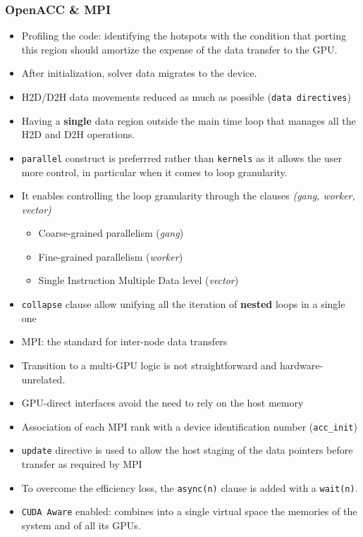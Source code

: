 \documentclass[10pt,a4paper]{article}
\newcommand{\code}[1]{\colorbox{light-gray}{\texttt{#1}}}
\begin{document}
\subsubsection{OpenACC \& MPI}
\begin{itemize}
\item Profiling the code: identifying the hotspots with the condition that porting this region should amortize the expense of the data transfer to the GPU.
\item After initialization, solver data migrates to the device.
\item H2D/D2H data movements reduced as much as possible (\code{data directives})
\item Having a \textbf{single} data region outside the main time loop that manages all the H2D and D2H operations.
\item \code{parallel} construct is preferrred rather than \code{kernels} as it allows the user more control, in particular when it comes to loop granularity.
\item It enables controlling the loop granularity through the clauses \textit{(gang, worker, vector)}
\begin{itemize}
\item Coarse-grained parallelism (\textit{gang})
\item Fine-grained parallelism (\textit{worker})
\item Single Instruction Multiple Data level (\textit{vector})
\end{itemize}
\item \code{collapse} clause allow unifying all the iteration of \textbf{nested }loops in a single one
\end{itemize}
\vspace{0.2cm}
\begin{itemize}
\item MPI: the standard for inter-node data transfers
\item Transition to a multi-GPU logic is not straightforward and hardware-unrelated.
\item GPU-direct interfaces avoid the need to rely on the host memory
\item Association of each MPI rank with a device identification number (\code{acc_init})
\item \code{update} directive is used to allow the host staging of the data pointers before transfer as required by MPI
\item To overcome the efficiency loss, the \code{async(n)} clause is added with a \code{wait(n)}.
\item \code{CUDA Aware} enabled: combines into a single virtual space the memories of the system and of all its GPUs.
\end{itemize}
\end{document}
